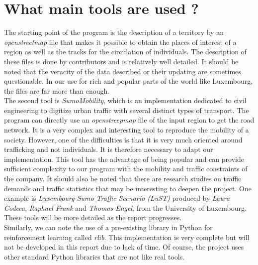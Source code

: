\section*{What main tools are used ?}

The starting point of the program is the description of a territory by an \textit{openstreetmap} file that makes it possible to obtain the places of interest of a region as well as the tracks for the circulation of individuals. The description of these files is done by contributors and is relatively well detailed. It should be noted that the veracity of the data described or their updating are sometimes questionable. In our use for rich and popular parts of the world like Luxembourg, the files are far more than enough.\\

The second tool is \textit{SumoMobility}, which is an implementation dedicated to civil engineering to digitize urban traffic with several distinct types of transport. The program can directly use an \textit{openstreepmap} file of the input region to get the road network. It is a very complex and interesting tool to reproduce the mobility of a society. However, one of the difficulties is that it is very much oriented around trafficking and not individuals. It is therefore necessary to adapt our implementation. This tool has the advantage of being popular and can provide sufficient complexity to our program with the mobility and traffic constraints of the company. It should also be noted that there are research studies on traffic demands and traffic statistics that may be interesting to deepen the project. One example is \textit{Luxembourg Sumo Traffic Scenario (LuST)} produced by \textit{Laura Codeca}, \textit{Raphael Frank} and \textit{Thomas Engel}, from the University of Luxembourg.\\

These tools will be more detailed as the report progresses.\\

Similarly, we can note the use of a pre-existing library in Python for reinforcement learning called \textit{rlib}. This implementation is very complete but will not be developed in this report due to lack of time. Of course, the project uses other standard Python libraries that are not like real tools.\\

\newpage

